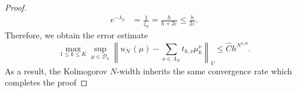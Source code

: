 \documentclass[10pt,a4paper]{amsart}
\begin{document}
\begin{proof}
    \begin{align}
        e^{-\lambda_h}&=\frac{1}{\zeta_h}= \frac{h}{h +2\varepsilon}\leq \frac{h}{2\varepsilon}.
    \end{align} 
    Therefore, we obtain the error estimate
    \begin{equation}
          \max_{1 \leq k \leq K}\sup_{\mu \in \mathcal{D}_k} \left\|u_{\mathcal{N}}(\mu)-\sum_{\nu \in \Lambda_N} t_{k,\nu} \mu_k^\nu \right\|_V \leq \hat C h^{N^{1/d}}.
    \end{equation}
    As a result, the Kolmogorov $N$-width inherits the same convergence rate which completes the proof
    
\end{proof}
\end{document}
